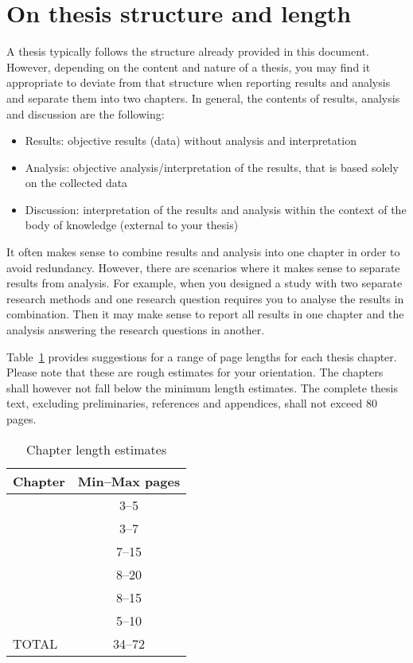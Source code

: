 
\section{On thesis structure and length}
A thesis typically follows the structure already provided in this document. However, depending on the content and nature of a thesis, you may find it appropriate to deviate from that structure when reporting results and analysis and separate them into two chapters. In general, the contents of results, analysis and discussion are the following:
\begin{itemize}
    \item Results: objective results (data) without analysis and interpretation
    \item Analysis: objective analysis/interpretation of the results, that is based solely on the collected data
    \item Discussion: interpretation of the results and analysis within the context of the body of knowledge (external to your thesis)
\end{itemize}

It often makes sense to combine results and analysis into one chapter in order to avoid redundancy. However, there are scenarios where it makes sense to separate results from analysis. For example, when you designed a study with two separate research methods and one research question requires you to analyse the results in combination. Then it may make sense to report all results in one chapter and the analysis answering the research questions in another. 

Table~\ref{tab:pl} provides suggestions for a range of page lengths for each thesis chapter. Please note that these are rough estimates for your orientation. The chapters shall however not fall below the minimum length estimates. The complete thesis text, excluding preliminaries, references and appendices, shall not exceed 80 pages. 

\begin{table}[htb]
    \centering
    \begin{tabular}{lc}
        \toprule
        Chapter & Min--Max pages  \\
        \midrule
        \nameref{chp:introduction} & 3--5 \\
        \nameref{chp:relatedwork} & 3--7 \\
        \nameref{chapter:method} & 7--15 \\
        \nameref{chp:results} & 8--20 \\
        \nameref{chp:discussion} & 8--15 \\
        \nameref{chp:conclusions} & 5--10 \\
        \midrule
        TOTAL & 34--72 \\
        \bottomrule
    \end{tabular}
    \caption{Chapter length estimates}
    \label{tab:pl}
\end{table}

